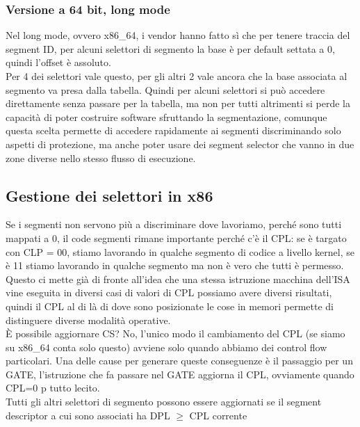 \documentclass[12pt, oneside]{extbook}
\begin{document}
\subsubsection{Versione a 64 bit, long mode}
Nel long mode, ovvero x86\_64, i vendor hanno fatto sì che per tenere traccia del segment ID, per alcuni selettori di segmento la base è per default settata a 0, quindi l'offset è assoluto.\\ Per 4 dei selettori vale questo, per gli altri 2 vale ancora che la base associata al segmento va presa dalla tabella. Quindi per alcuni selettori si può accedere direttamente senza passare per la tabella, ma non per tutti altrimenti si perde la capacità di poter costruire software sfruttando la segmentazione, comunque questa scelta permette di accedere rapidamente ai segmenti discriminando solo aspetti di protezione, ma anche poter usare dei segment selector che vanno in due zone diverse nello stesso flusso di esecuzione.
\subsection{Gestione dei selettori in x86}
Se i segmenti non servono più a discriminare dove lavoriamo, perché sono tutti mappati a 0, il code segmenti rimane importante perché c'è il CPL: se è targato con CLP = 00, stiamo lavorando in qualche segmento di codice a livello kernel, se è 11 stiamo lavorando in qualche segmento ma non è vero che tutti è permesso. Questo ci mette già di fronte all'idea che una stessa istruzione macchina dell'ISA vine eseguita in diversi casi di valori di CPL possiamo avere diversi risultati, quindi il CPL al di là di dove sono posizionate le cose in memori permette di distinguere diverse modalità operative.\\ È possibile aggiornare CS? No, l'unico modo il cambiamento del CPL (se siamo su x86\_64 conta solo questo) avviene solo quando abbiamo dei control flow particolari. Una delle cause per generare queste conseguenze è il passaggio per un GATE, l'istruzione che fa passare nel GATE aggiorna il CPL, ovviamente quando CPL=0 p tutto lecito.\\ Tutti gli altri selettori di segmento possono essere aggiornati se il segment descriptor a cui sono associati ha DPL $\geq$ CPL corrente
\end{document}
